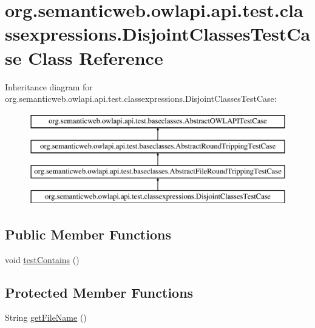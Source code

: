 \hypertarget{classorg_1_1semanticweb_1_1owlapi_1_1api_1_1test_1_1classexpressions_1_1_disjoint_classes_test_case}{\section{org.\-semanticweb.\-owlapi.\-api.\-test.\-classexpressions.\-Disjoint\-Classes\-Test\-Case Class Reference}
\label{classorg_1_1semanticweb_1_1owlapi_1_1api_1_1test_1_1classexpressions_1_1_disjoint_classes_test_case}
}
Inheritance diagram for org.\-semanticweb.\-owlapi.\-api.\-test.\-classexpressions.\-Disjoint\-Classes\-Test\-Case\-:\begin{figure}[H]
\begin{center}
\leavevmode
\includegraphics[height=4.000000cm]{classorg_1_1semanticweb_1_1owlapi_1_1api_1_1test_1_1classexpressions_1_1_disjoint_classes_test_case}
\end{center}
\end{figure}
\subsection*{Public Member Functions}
\begin{DoxyCompactItemize}
\item 
void \hyperlink{classorg_1_1semanticweb_1_1owlapi_1_1api_1_1test_1_1classexpressions_1_1_disjoint_classes_test_case_adb12fc718ec805b9e625b9e31be2c09a}{test\-Contains} ()
\end{DoxyCompactItemize}
\subsection*{Protected Member Functions}
\begin{DoxyCompactItemize}
\item 
String \hyperlink{classorg_1_1semanticweb_1_1owlapi_1_1api_1_1test_1_1classexpressions_1_1_disjoint_classes_test_case_ab62a2b6b07dcd925b0978da065022632}{get\-File\-Name} ()
\end{DoxyCompactItemize}


